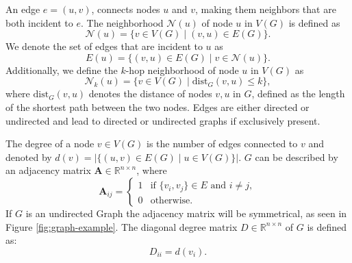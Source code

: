 An edge $e=(u,v)$, connects nodes $u$ and $v$, making them neighbors that are both incident to $e$. The neighborhood $\mathcal{N}(u)$ of node $u$ in $V(G)$ is defined as 
\begin{equation*}
    \mathcal{N}(u) = \{v \in V(G) \mid (v,u) \in E(G)\}.
\end{equation*} 
We denote the set of edges that are incident to $u$ as 
\begin{equation*}
    E(u) = \{(v,u) \in E(G) \mid v \in \mathcal{N}(u)\}.
\end{equation*}
Additionally, we define the $k$-hop neighborhood of node $u$ in $V(G)$ as 
\begin{equation*}
    \mathcal{N}_k(u) = \{v \in V(G) \mid \text{dist}_G(v,u) \leq k\},
\end{equation*}
where $\text{dist}_G(v,u)$ denotes the distance of nodes $v, u$ in $G$, defined as the length of the shortest path between the two nodes. Edges are either directed or undirected and lead to directed or undirected graphs if exclusively present. \bigskip

The degree of a node $v \in V(G)$ is the number of edges connected to $v$ and denoted by $d(v) = |\{(u,v) \in E(G) \mid u \in V(G)\}|$. $G$ can be described by an adjacency matrix $\mathbf{A} \in \mathbb{R}^{n \times n}$, where
\begin{equation*}
    \mathbf{A}_{ij}=\begin{cases}
        1 & \text{if } \{v_i,v_j\}\in E \text{ and } i \neq j, \\
        0 & \text{otherwise.}
    \end{cases}
\end{equation*}
If $G$ is an undirected Graph the adjacency matrix will be symmetrical, as seen in Figure \ref{fig:graph-example}.
The diagonal degree matrix $D\in \mathbb{R}^{n\times n}$ of $G$ is defined as:
\begin{equation*}
    D_{ii} = d(v_i).
\end{equation*}


